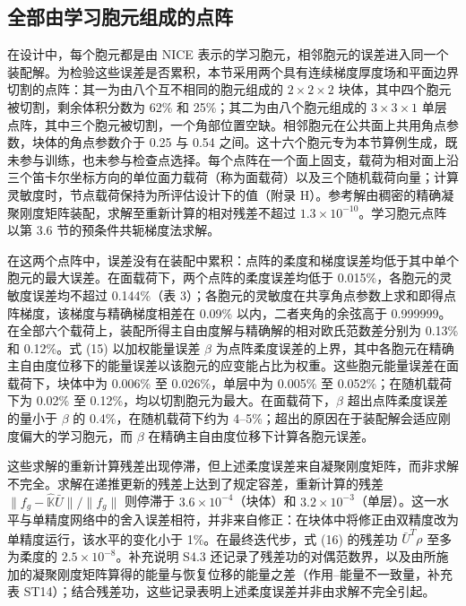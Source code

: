 \documentclass[preprint,12pt,authoryear]{elsarticle}
\begin{document}
\subsection{全部由学习胞元组成的点阵}

在设计中，每个胞元都是由 NICE 表示的学习胞元，相邻胞元的误差进入同一个装配解。为检验这些误差是否累积，本节采用两个具有连续梯度厚度场和平面边界切割的点阵：其一为由八个互不相同的胞元组成的 \(2\times2\times2\) 块体，其中四个胞元被切割，剩余体积分数为 62\% 和 25\%；其二为由八个胞元组成的 \(3\times3\times1\) 单层点阵，其中三个胞元被切割，一个角部位置空缺。相邻胞元在公共面上共用角点参数，块体的角点参数介于 0.25 与 0.54 之间。这十六个胞元专为本节算例生成，既未参与训练，也未参与检查点选择。每个点阵在一个面上固支，载荷为相对面上沿三个笛卡尔坐标方向的单位面力载荷（称为面载荷）以及三个随机载荷向量；计算灵敏度时，节点载荷保持为所评估设计下的值（附录 H）。参考解由稠密的精确凝聚刚度矩阵装配，求解至重新计算的相对残差不超过 \(1.3\times10^{-10}\)。学习胞元点阵以第 3.6 节的预条件共轭梯度法求解。

在这两个点阵中，误差没有在装配中累积：点阵的柔度和梯度误差均低于其中单个胞元的最大误差。在面载荷下，两个点阵的柔度误差均低于 0.015\%，各胞元的灵敏度误差均不超过 0.144\%（表 3）；各胞元的灵敏度在共享角点参数上求和即得点阵梯度，该梯度与精确梯度相差在 0.09\% 以内，二者夹角的余弦高于 0.999999。在全部六个载荷上，装配所得主自由度解与精确解的相对欧氏范数差分别为 0.13\% 和 0.12\%。式 (15) 以加权能量误差 \(\beta\) 为点阵柔度误差的上界，其中各胞元在精确主自由度位移下的能量误差以该胞元的应变能占比为权重。这些胞元能量误差在面载荷下，块体中为 0.006\% 至 0.026\%，单层中为 0.005\% 至 0.052\%；在随机载荷下为 0.02\% 至 0.12\%，均以切割胞元为最大。在面载荷下，\(\beta\) 超出点阵柔度误差的量小于 \(\beta\) 的 0.4\%，在随机载荷下约为 4--5\%；超出的原因在于装配解会适应刚度偏大的学习胞元，而 \(\beta\) 在精确主自由度位移下计算各胞元误差。

这些求解的重新计算残差出现停滞，但上述柔度误差来自凝聚刚度矩阵，而非求解不完全。求解在递推更新的残差上达到了规定容差，重新计算的残差 \(\|f_g-\widehat{\mathbb K}\bar U\|/\|f_g\|\) 则停滞于 \(3.6\times10^{-4}\)（块体）和 \(3.2\times10^{-3}\)（单层）。这一水平与单精度网络中的舍入误差相符，并非来自修正：在块体中将修正由双精度改为单精度运行，该水平的变化小于 1\%。在最终迭代步，式 (16) 的残差功 \(\bar U^T\rho\) 至多为柔度的 \(2.5\times10^{-8}\)。补充说明 S4.3 还记录了残差功的对偶范数界，以及由所施加的凝聚刚度矩阵算得的能量与恢复位移的能量之差（作用--能量不一致量，补充表 ST14）；结合残差功，这些记录表明上述柔度误差并非由求解不完全引起。
\end{document}
